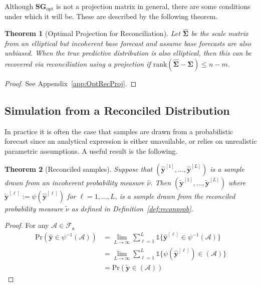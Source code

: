 \documentclass[11pt]{article}
\newtheorem{theo}{Theorem}[section]
\theoremstyle{definition}
\begin{document}
Although $\bm{S}\bm{G}_{\text{opt}}$ is not a projection matrix in general, there are some conditions under which it will be. These are described by the following theorem.
\begin{theo}[Optimal Projection for Reconciliation]\label{theo:OptRecProj}
	Let $\hat{\bm{\Sigma}}$ be the scale matrix from an elliptical but incoherent base forecast and assume base forecasts are also unbiased. When the true predictive distribution is also elliptical, then this can be recovered via reconciliation using a projection if $\textrm{rank}(\hat{\bm{\Sigma}}-\bm{\Sigma})\leq n-m$.
\end{theo}
\begin{proof}
	See Appendix~\ref{app:OptRecProj}.
\end{proof}

\subsection{Simulation from a Reconciled Distribution}\label{sec:SampleSolution}

In practice it is often the case that samples are drawn from a probabilistic forecast since an analytical expression is either unavailable, or relies on unrealistic parametric assumptions. A useful result is the following.
\begin{theo}[Reconciled samples]
	Suppose that $\left(\hat{\bm{y}}^{[1]},\ldots,\hat{\bm{y}}^{[L]}\right)$ is a sample drawn from an incoherent probability measure $\hat{\nu}$. Then $\left(\tilde{\bm{y}}^{[1]},\ldots,\tilde{\bm{y}}^{[L]}\right)$ where $\tilde{\bm{y}}^{[\ell]}:=\psi(\hat{\bm{y}}^{[\ell]})$ for $\ell=1,\ldots,L$, is a sample drawn from the reconciled probability measure $\tilde{\nu}$ as defined in Definition~\ref{def:reconprob}.
\end{theo}
\begin{proof}
	For any $\mathcal{A}\in\mathscr{F}_{\mathfrak{s}}$
\begin{align}
	\mbox{Pr}(\hat{\bm{y}}\in\psi^{-1}(\mathcal{A}))&=\underset{L\rightarrow\infty}{\lim}\sum\limits_{\ell=1}^L\mathbb{1}\big\{\hat{\bm{y}}^{[\ell]}\in\psi^{-1}(\mathcal{A})\big\}\nonumber\\
	&=\underset{L\rightarrow\infty}{\lim}\sum\limits_{\ell=1}^L\mathbb{1}\big\{\psi(\hat{\bm{y}}^{[\ell]})\in(\mathcal{A})\big\}\nonumber\\
	&=\mbox{Pr}(\tilde{\bm{y}}\in(\mathcal{A}))\nonumber
\end{align}
\end{proof}
\end{document}

